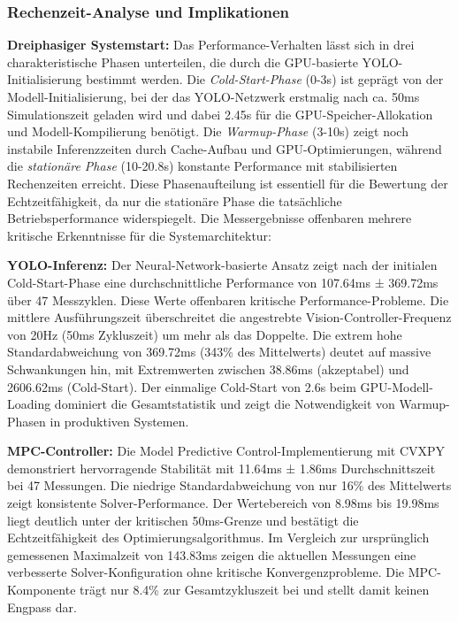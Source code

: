 \subsubsection{ Rechenzeit-Analyse und Implikationen}
\label{sec:performance-characteristics}


\textbf{Dreiphasiger Systemstart:} Das Performance-Verhalten lässt sich in drei charakteristische Phasen unterteilen, die durch die 
GPU-basierte YOLO-Initialisierung bestimmt werden. Die \textit{Cold-Start-Phase} (0-3s) ist geprägt von der Modell-Initialisierung, 
bei der das YOLO-Netzwerk erstmalig nach ca. 50ms Simulationszeit geladen wird und dabei 2.45s für die GPU-Speicher-Allokation und
Modell-Kompilierung benötigt. Die \textit{Warmup-Phase} (3-10s) zeigt noch instabile Inferenzzeiten durch Cache-Aufbau und 
GPU-Optimierungen, während die \textit{stationäre Phase} (10-20.8s) konstante Performance mit stabilisierten Rechenzeiten 
erreicht. Diese Phasenaufteilung ist essentiell für die Bewertung der Echtzeitfähigkeit, da nur die stationäre Phase die 
tatsächliche Betriebsperformance widerspiegelt. 
\newpage
Die Messergebnisse offenbaren mehrere kritische Erkenntnisse für die Systemarchitektur:

\textbf{YOLO-Inferenz:} Der Neural-Network-basierte Ansatz zeigt nach der initialen Cold-Start-Phase eine 
durchschnittliche Performance von 107.64ms ± 369.72ms über 47 Messzyklen. Diese Werte offenbaren kritische 
Performance-Probleme. Die mittlere Ausführungszeit überschreitet die angestrebte Vision-Controller-Frequenz 
von 20Hz (50ms Zykluszeit) um mehr als das Doppelte. Die extrem hohe Standardabweichung von 369.72ms 
(343\% des Mittelwerts) deutet auf massive Schwankungen hin, mit Extremwerten zwischen 38.86ms (akzeptabel) 
und 2606.62ms (Cold-Start). Der einmalige Cold-Start von 2.6s beim GPU-Modell-Loading dominiert die 
Gesamtstatistik und zeigt die Notwendigkeit von Warmup-Phasen in produktiven Systemen.

\textbf{MPC-Controller:} Die Model Predictive Control-Implementierung mit CVXPY demonstriert hervorragende 
Stabilität mit 11.64ms ± 1.86ms Durchschnittszeit bei 47 Messungen. Die niedrige Standardabweichung von nur 16\% 
des Mittelwerts zeigt konsistente Solver-Performance. Der Wertebereich von 8.98ms bis 19.98ms liegt deutlich unter 
der kritischen 50ms-Grenze und bestätigt die Echtzeitfähigkeit des Optimierungsalgorithmus. Im Vergleich zur 
ursprünglich gemessenen Maximalzeit von 143.83ms zeigen die aktuellen Messungen eine verbesserte Solver-Konfiguration 
ohne kritische Konvergenzprobleme. Die MPC-Komponente trägt nur 8.4\% zur Gesamtzykluszeit bei und stellt damit 
keinen Engpass dar.


